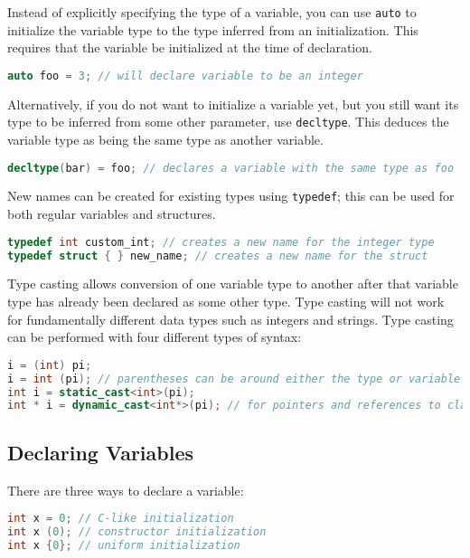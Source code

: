 \documentclass[10pt]{article}
\begin{document}
Instead of explicitly specifying the type of a variable, you can use \texttt{auto} to initialize the variable type to the type inferred from an initialization. This requires that the variable be initialized at the time of declaration.

\begin{lstlisting}[language=C++]
auto foo = 3; // will declare variable to be an integer
\end{lstlisting}

Alternatively, if you do not want to initialize a variable yet, but you still want its type to be inferred from some other parameter, use \texttt{decltype}. This deduces the variable type as being the same type as another variable.

\begin{lstlisting}[language=C++]
decltype(bar) = foo; // declares a variable with the same type as foo
\end{lstlisting}

New names can be created for existing types using \texttt{typedef}; this can be used for both regular variables and structures.

\begin{lstlisting}[language=C++]
typedef int custom_int; // creates a new name for the integer type
typedef struct { } new_name; // creates a new name for the struct
\end{lstlisting}

Type casting allows conversion of one variable type to another after that variable type has already been declared as some other type. Type casting will not work for fundamentally different data types such as integers and strings. Type casting can be performed with four different types of syntax:

\begin{lstlisting}[language=C++]
i = (int) pi; 
i = int (pi); // parentheses can be around either the type or variable
int i = static_cast<int>(pi);
int * i = dynamic_cast<int*>(pi); // for pointers and references to classes
\end{lstlisting}

\subsection{Declaring Variables}

There are three ways to declare a variable:

\begin{lstlisting}[language=C++]
int x = 0; // C-like initialization
int x (0); // constructor initialization
int x {0}; // uniform initialization
\end{lstlisting}
\end{document}
